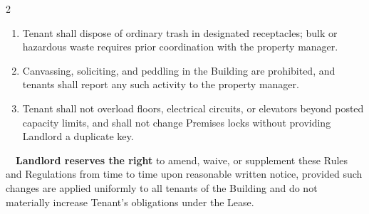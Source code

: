 \documentclass[10pt,a4paper]{scrreprt}
\begin{document}
\begin{multicols}{2}
\begin{enumerate}[leftmargin=*,itemsep=2pt,label=\arabic*.]
  brought into elevators, lobbies, or the Premises.
\item Tenant shall dispose of ordinary trash in designated receptacles; bulk or hazardous waste
  requires prior coordination with the property manager.
\item Canvassing, soliciting, and peddling in the Building are prohibited, and tenants shall
  report any such activity to the property manager.
\item Tenant shall not overload floors, electrical circuits, or elevators beyond posted capacity
  limits, and shall not change Premises locks without providing Landlord a duplicate key.
\end{enumerate}
\end{multicols}

\vspace{5pt}
\noindent\begin{tcolorbox}[colback=leasepaper,colframe=leasegold,boxrule=0.8pt,arc=1pt,
  left=10pt,right=10pt,top=6pt,bottom=6pt]
\small\faExclamationTriangle\ \ \textbf{Landlord reserves the right} to amend, waive, or
supplement these Rules and Regulations from time to time upon reasonable written notice,
provided such changes are applied uniformly to all tenants of the Building and do not materially
increase Tenant's obligations under the Lease.
\end{tcolorbox}
\end{document}
